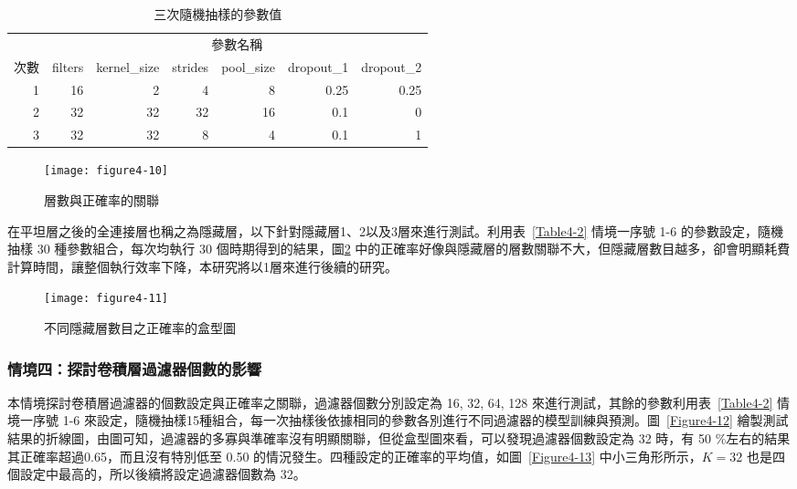 \documentclass[12pt, a4paper]{article} 				%
\begin{document}
\begin{table}[!ht]
\begin{center}
\caption{三次隨機抽樣的參數值}\label{Table4-6}
\begin{tabular}{rrrrrrr}\toprule
 & \multicolumn{6}{c}{參數名稱}\\
次數	&	filters	&	kernel\_size	&	strides	&	pool\_size	&	dropout\_1	&	dropout\_2	\\\midrule
1	&	16	&	2	&	4	&	8	&	0.25	&	0.25	\\
2	&	32	&	32	&	32	&	16	&	0.1	&	0	\\
3	&	32	&	32	&	8	&	4	&	0.1	&	1	\\\bottomrule
\end{tabular}
\end{center}
\end{table}

\begin{figure}[!ht]
\begin{center}
\texttt{[image: figure4-10]}
\caption{層數與正確率的關聯}\label{Figure4-10}
\end{center}
\end{figure}

在平坦層之後的全連接層也稱之為隱藏層，以下針對隱藏層1、2以及3層來進行測試。利用表~\ref{Table4-2} 情境一序號 1-6 的參數設定，隨機抽樣 30 種參數組合，每次均執行 30 個時期得到的結果，圖\ref{Figure4-11} 中的正確率好像與隱藏層的層數關聯不大，但隱藏層數目越多，卻會明顯耗費計算時間，讓整個執行效率下降，本研究將以1層來進行後續的研究。

\begin{figure}[!ht]
\begin{center}
\texttt{[image: figure4-11]}
\caption{不同隱藏層數目之正確率的盒型圖}\label{Figure4-11}
\end{center}
\end{figure}

\subsubsection{情境四：探討卷積層過濾器個數的影響}
本情境探討卷積層過濾器的個數設定與正確率之關聯，過濾器個數分別設定為 16, 32, 64, 128 來進行測試，其餘的參數利用表~\ref{Table4-2} 情境一序號 1-6 來設定，隨機抽樣15種組合，每一次抽樣後依據相同的參數各別進行不同過濾器的模型訓練與預測。圖~\ref{Figure4-12} 繪製測試結果的折線圖，由圖可知，過濾器的多寡與準確率沒有明顯關聯，但從盒型圖來看，可以發現過濾器個數設定為 32 時，有 50 \%左右的結果其正確率超過0.65，而且沒有特別低至 0.50 的情況發生。四種設定的正確率的平均值，如圖~\ref{Figure4-13} 中小三角形所示，$K=32$ 也是四個設定中最高的，所以後續將設定過濾器個數為 32。
\end{document}

